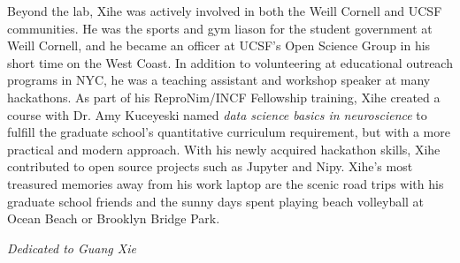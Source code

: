 \documentclass[phd,tocprelim]{cornell}
\begin{document}
\begin{biosketch}
Beyond the lab, Xihe was actively involved in both the Weill Cornell and UCSF communities. He was the sports and gym liason for the student government at Weill Cornell, and he became an officer at UCSF's Open Science Group in his short time on the West Coast. In addition to volunteering at educational outreach programs in NYC, he was a teaching assistant and workshop speaker at many hackathons. As part of his ReproNim/INCF Fellowship training, Xihe created a course with Dr. Amy Kuceyeski named \emph{data science basics in neuroscience} to fulfill the graduate school's quantitative curriculum requirement, but with a more practical and modern approach. With his newly acquired hackathon skills, Xihe contributed to open source projects such as Jupyter and Nipy. Xihe's most treasured memories away from his work laptop are the scenic road trips with his graduate school friends and the sunny days spent playing beach volleyball at Ocean Beach or Brooklyn Bridge Park.
\end{biosketch}

\begin{dedication}
\emph{Dedicated to Guang Xie}
\end{dedication}
\end{document}
